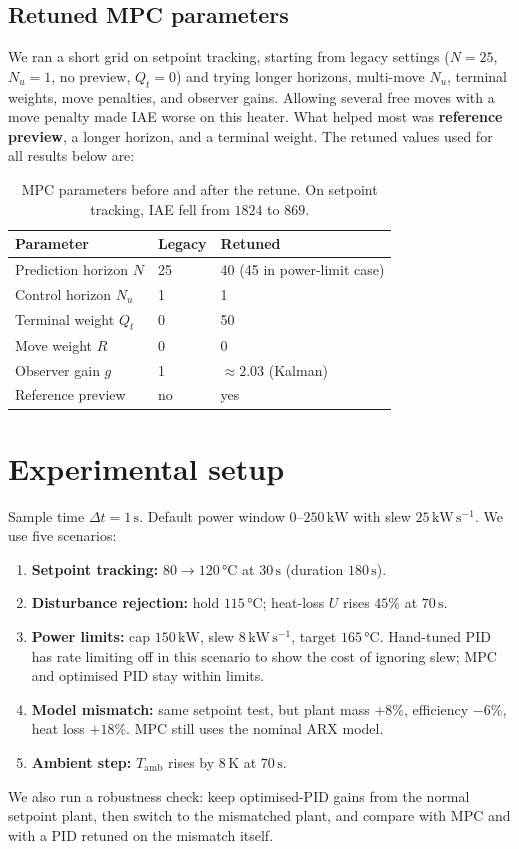 \documentclass[11pt,a4paper]{article}
\newcommand{\unitC}{\si{\celsius}}
\begin{document}
\subsection{Retuned MPC parameters}
\label{sec:retune}
We ran a short grid on setpoint tracking, starting from legacy settings (\(N{=}25\), \(N_u{=}1\), no preview, \(Q_t{=}0\)) and trying longer horizons, multi-move \(N_u\), terminal weights, move penalties, and observer gains.
Allowing several free moves with a move penalty made IAE worse on this heater.
What helped most was \textbf{reference preview}, a longer horizon, and a terminal weight.
The retuned values used for all results below are:

\begin{table}[H]
\centering
\small
\begin{tabular}{lll}
\toprule
Parameter & Legacy & Retuned \\
\midrule
Prediction horizon \(N\) & 25 & 40 (45 in power-limit case) \\
Control horizon \(N_u\) & 1 & 1 \\
Terminal weight \(Q_t\) & 0 & 50 \\
Move weight \(R\) & 0 & 0 \\
Observer gain \(g\) & 1 & \(\approx 2.03\) (Kalman) \\
Reference preview & no & yes \\
\bottomrule
\end{tabular}
\caption{MPC parameters before and after the retune. On setpoint tracking, IAE fell from \(1824\) to \(869\).}
\label{tab:retune}
\end{table}

\section{Experimental setup}
Sample time \(\Delta t{=}1\,\mathrm{s}\).
Default power window \(0\)--\(250\,\mathrm{kW}\) with slew \(25\,\mathrm{kW\,s^{-1}}\).
We use five scenarios:

\begin{enumerate}
  \item \textbf{Setpoint tracking:} \(80\to 120\,\unitC\) at \(30\,\mathrm{s}\) (duration \(180\,\mathrm{s}\)).
  \item \textbf{Disturbance rejection:} hold \(115\,\unitC\); heat-loss \(U\) rises \(45\%\) at \(70\,\mathrm{s}\).
  \item \textbf{Power limits:} cap \(150\,\mathrm{kW}\), slew \(8\,\mathrm{kW\,s^{-1}}\), target \(165\,\unitC\). Hand-tuned PID has rate limiting off in this scenario to show the cost of ignoring slew; MPC and optimised PID stay within limits.
  \item \textbf{Model mismatch:} same setpoint test, but plant mass \({+}8\%\), efficiency \({-}6\%\), heat loss \({+}18\%\). MPC still uses the nominal ARX model.
  \item \textbf{Ambient step:} \(T_{\mathrm{amb}}\) rises by \(8\,\mathrm{K}\) at \(70\,\mathrm{s}\).
\end{enumerate}
We also run a robustness check: keep optimised-PID gains from the normal setpoint plant, then switch to the mismatched plant, and compare with MPC and with a PID retuned on the mismatch itself.
\end{document}
